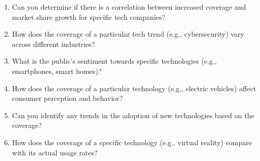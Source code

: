 \begin{footnotesize}
\begin{enumerate}
\item Can you determine if there is a correlation between increased coverage and market share growth for specific tech companies?
\item How does the coverage of a particular tech trend (e.g., cybersecurity) vary across different industries?
\item What is the public's sentiment towards specific technologies (e.g., smartphones, smart homes)?
\item How does the coverage of a particular technology (e.g., electric vehicles) affect consumer perception and behavior?
\item Can you identify any trends in the adoption of new technologies based on the coverage?
\item How does the coverage of a specific technology (e.g., virtual reality) compare with its actual usage rates?
\end{enumerate}
\end{footnotesize}

